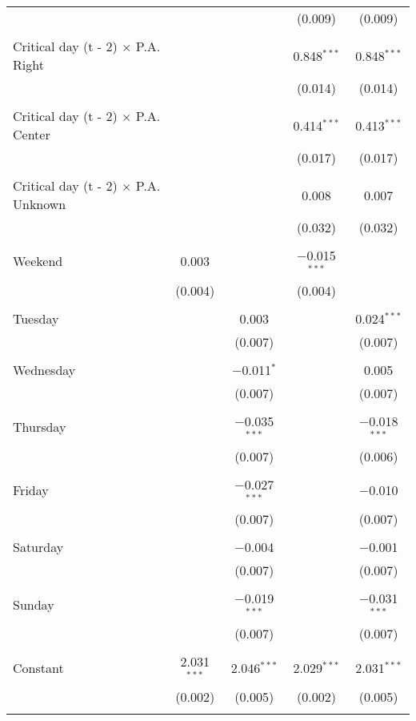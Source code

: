 \documentclass[
]{article}
\begin{document}
\begin{table}[!htbp]
{\begin{tabular}{@{\extracolsep{5pt}}lcccc}
  &  &  & (0.009) & (0.009) \\ 
  & & & & \\ 
 Critical day (t - 2) $\times$ P.A. Right &  &  & 0.848$^{***}$ & 0.848$^{***}$ \\ 
  &  &  & (0.014) & (0.014) \\ 
  & & & & \\ 
 Critical day (t - 2) $\times$ P.A. Center &  &  & 0.414$^{***}$ & 0.413$^{***}$ \\ 
  &  &  & (0.017) & (0.017) \\ 
  & & & & \\ 
 Critical day (t - 2) $\times$ P.A. Unknown &  &  & 0.008 & 0.007 \\ 
  &  &  & (0.032) & (0.032) \\ 
  & & & & \\ 
 Weekend & 0.003 &  & $-$0.015$^{***}$ &  \\ 
  & (0.004) &  & (0.004) &  \\ 
  & & & & \\ 
 Tuesday &  & 0.003 &  & 0.024$^{***}$ \\ 
  &  & (0.007) &  & (0.007) \\ 
  & & & & \\ 
 Wednesday &  & $-$0.011$^{*}$ &  & 0.005 \\ 
  &  & (0.007) &  & (0.007) \\ 
  & & & & \\ 
 Thursday &  & $-$0.035$^{***}$ &  & $-$0.018$^{***}$ \\ 
  &  & (0.007) &  & (0.006) \\ 
  & & & & \\ 
 Friday &  & $-$0.027$^{***}$ &  & $-$0.010 \\ 
  &  & (0.007) &  & (0.007) \\ 
  & & & & \\ 
 Saturday &  & $-$0.004 &  & $-$0.001 \\ 
  &  & (0.007) &  & (0.007) \\ 
  & & & & \\ 
 Sunday &  & $-$0.019$^{***}$ &  & $-$0.031$^{***}$ \\ 
  &  & (0.007) &  & (0.007) \\ 
  & & & & \\ 
 Constant & 2.031$^{***}$ & 2.046$^{***}$ & 2.029$^{***}$ & 2.031$^{***}$ \\ 
  & (0.002) & (0.005) & (0.002) & (0.005) \\ 
  & & & & \\ 

\end{tabular}}
\end{table}
\end{document}
